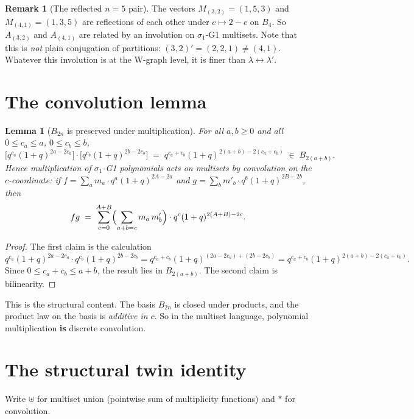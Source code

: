 \documentclass[11pt]{article}
\newtheorem{lemma}[theorem]{Lemma}
\theoremstyle{definition}
\newtheorem{remark}[theorem]{Remark}
\begin{document}
\begin{remark}[The reflected $n=5$ pair]
The vectors $M_{(3,2)} = (1,5,3)$ and $M_{(4,1)} = (1,3,5)$ are reflections of each other under $c \mapsto 2 - c$ on $B_4$. So $A_{(3,2)}$ and $A_{(4,1)}$ are related by an involution on $\sigma_1$-G1 multisets. Note that this is \emph{not} plain conjugation of partitions: $(3,2)' = (2,2,1) \neq (4,1)$. Whatever this involution is at the W-graph level, it is finer than $\lambda \leftrightarrow \lambda'$.
\end{remark}

\section{The convolution lemma}

\begin{lemma}[$B_{2n}$ is preserved under multiplication]\label{lem:conv}
For all $a,b \geq 0$ and all $0 \leq c_a \leq a$, $0 \leq c_b \leq b$,
\[
\bigl[q^{c_a}(1+q)^{2a - 2c_a}\bigr] \cdot \bigl[q^{c_b}(1+q)^{2b - 2c_b}\bigr] \;=\; q^{c_a + c_b}(1+q)^{2(a+b) - 2(c_a+c_b)} \;\in\; B_{2(a+b)}.
\]
Hence multiplication of $\sigma_1$-G1 polynomials acts on multisets by convolution on the $c$-coordinate: if $f = \sum_a m_a \cdot q^a(1+q)^{2A-2a}$ and $g = \sum_b m'_b \cdot q^b(1+q)^{2B-2b}$, then
\[
fg \;=\; \sum_{c=0}^{A+B}\Bigl(\sum_{a+b=c} m_a \, m'_b\Bigr) \cdot q^c (1+q)^{2(A+B) - 2c}.
\]
\end{lemma}

\begin{proof}
The first claim is the calculation
\[
q^{c_a}(1+q)^{2a-2c_a} \cdot q^{c_b}(1+q)^{2b-2c_b} = q^{c_a+c_b}(1+q)^{(2a-2c_a)+(2b-2c_b)} = q^{c_a+c_b}(1+q)^{2(a+b)-2(c_a+c_b)}.
\]
Since $0 \leq c_a + c_b \leq a + b$, the result lies in $B_{2(a+b)}$. The second claim is bilinearity.
\end{proof}

This is the structural content. The basis $B_{2n}$ is closed under products, and the product law on the basis is \emph{additive in $c$}. So in the multiset language, polynomial multiplication \textbf{is} discrete convolution.

\section{The structural twin identity}

Write $\uplus$ for multiset union (pointwise sum of multiplicity functions) and $\ast$ for convolution.
\end{document}
